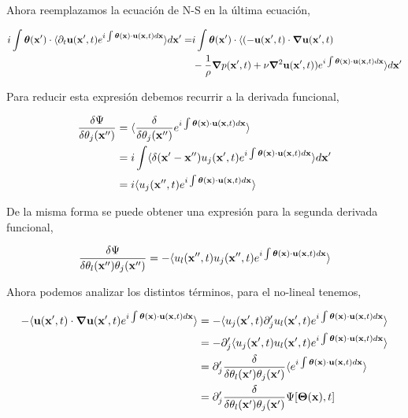 \documentclass[executivepaper,12pt]{article}
\numberwithin{equation}{section}
\begin{document}
Ahora reemplazamos la ecuación de N-S en la última ecuación,

\begin{align*}
	i\int \bm{\theta}(\vb{x}')\cdot\langle \partial_t \vb{u}(\vb{x}',t)e^{i\int \bm{\theta}(\vb{x})\cdot\vb{u}(\vb{x},t) d\vb{x}} \rangle d\vb{x}'=&i\int \bm{\theta}(\vb{x}')\cdot\langle ( -\vb{u}(\vb{x}',t)\cdot\grad{} \vb{u}(\vb{x}',t)\\
	&-\frac{1}{\rho}\grad{}p(\vb{x}',t) +\nu\grad{}^2\vb{u}(\vb{x}',t) )e^{i\int \bm{\theta}(\vb{x})\cdot\vb{u}(\vb{x},t) d\vb{x}} \rangle d\vb{x}'
\end{align*}

Para reducir esta expresión debemos recurrir a la derivada funcional,

\begin{align*}
	\frac{\delta \Psi}{\delta \theta_j (\vb{x''})}&=\langle \frac{\delta}{\delta \theta_j (\vb{x''})}e^{i\int \bm{\theta}(\vb{x})\cdot\vb{u}(\vb{x},t) d\vb{x}} \rangle\\
	&=i\int \langle \delta(\vb{x}'-\vb{x}'')u_j(\vb{x}',t) e^{i\int \bm{\theta}(\vb{x})\cdot\vb{u}(\vb{x},t) d\vb{x}} \rangle d\vb{x}'\\
	&=i\langle u_j(\vb{x}'',t) e^{i\int \bm{\theta}(\vb{x})\cdot\vb{u}(\vb{x},t) d\vb{x}} \rangle \\
\end{align*}

De la misma forma se puede obtener una expresión para la segunda derivada funcional,

\begin{equation*}
	\frac{\delta \Psi}{\delta \theta_l (\vb{x''})\theta_j (\vb{x''})}=-\langle u_l(\vb{x}'',t) u_j(\vb{x}'',t) e^{i\int \bm{\theta}(\vb{x})\cdot\vb{u}(\vb{x},t) d\vb{x}} \rangle
\end{equation*}

Ahora podemos analizar los distintos términos, para el no-lineal tenemos,

\begin{align*}
	-\langle \vb{u}(\vb{x}',t)\cdot\grad{} \vb{u}(\vb{x}',t)e^{i\int \bm{\theta}(\vb{x})\cdot\vb{u}(\vb{x},t) d\vb{x}} \rangle &=-\langle u_j(\vb{x}',t)\partial'_j u_l(\vb{x}',t)e^{i\int \bm{\theta}(\vb{x})\cdot\vb{u}(\vb{x},t) d\vb{x}} \rangle\\ 
	&=-\partial'_j \langle u_j(\vb{x}',t) u_l(\vb{x}',t)e^{i\int \bm{\theta}(\vb{x})\cdot\vb{u}(\vb{x},t) d\vb{x}} \rangle\\ 
	&=\partial'_j  \frac{\delta}{\delta \theta_l (\vb{x'})\theta_j (\vb{x'})} \langle e^{i\int \bm{\theta}(\vb{x})\cdot\vb{u}(\vb{x},t) d\vb{x}} \rangle\\
	&=\partial'_j  \frac{\delta}{\delta \theta_l (\vb{x'})\theta_j (\vb{x'})} \Psi [\bm{\Theta}(\vb{x}),t]
\end{align*}
\end{document}
